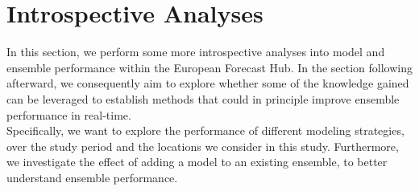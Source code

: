 \newpage
\section{Introspective Analyses}
In this section, we perform some more introspective analyses into model and ensemble performance within the European Forecast Hub. In the section following afterward, we consequently aim to explore whether some of the knowledge gained can be leveraged to establish methods that could in principle improve ensemble performance in real-time.\\
Specifically, we want to explore the performance of different modeling strategies, over the study period and the locations we consider in this study. Furthermore, we investigate the effect of adding a model to an existing ensemble, to better understand ensemble performance.
